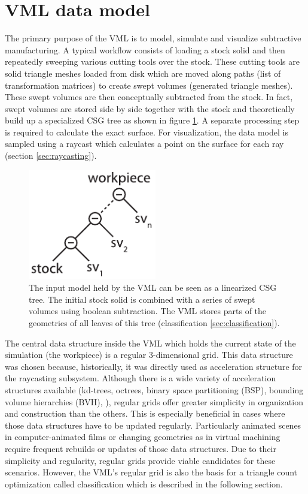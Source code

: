 \section{VML data model}
\label{sec:vml_data_model}

The primary purpose of the VML is to model, simulate and visualize subtractive manufacturing.
A typical workflow consists of loading a stock solid and then repeatedly sweeping various cutting tools over the stock.
These cutting tools are solid triangle meshes loaded from disk which are moved along paths (list of transformation matrices) to create swept volumes (generated triangle meshes).
These swept volumes are then conceptually subtracted from the stock.
In fact, swept volumes are stored side by side together with the stock and theoretically build up a specialized CSG tree as shown in figure \ref{fig:vml_csg}.
A separate processing step is required to calculate the exact surface.
For visualization, the data model is sampled using a raycast which calculates a point on the surface for each ray (\cf section \ref{sec:raycasting}).

\begin{figure}
	\centering
	\includegraphics[width=0.5\textwidth]{images/vml_csg}
	\caption{
		The input model held by the VML can be seen as a linearized CSG tree.
		The initial stock solid is combined with a series of swept volumes using boolean subtraction.
		The VML stores parts of the geometries of all leaves of this tree (\cf classification \ref{sec:classification}).
	}
	\label{fig:vml_csg}
\end{figure}


The central data structure inside the VML which holds the current state of the simulation (\ie the workpiece) is a regular 3-dimensional grid.
This data structure was chosen because, historically, it was directly used as acceleration structure for the raycasting subsystem.
Although there is a wide variety of acceleration structures available (\eg kd-trees, octrees, binary space partitioning (BSP), bounding volume hierarchies (BVH), \etc), regular grids offer greater simplicity in organization and construction than the others.
This is especially beneficial in cases where those data structures have to be updated regularly.
Particularly animated scenes in computer-animated films or changing geometries as in virtual machining require frequent rebuilds or updates of those data structures.
Due to their simplicity and regularity, regular grids provide viable candidates for these scenarios.
However, the VML's regular grid is also the basis for a triangle count optimization called classification which is described in the following section.


